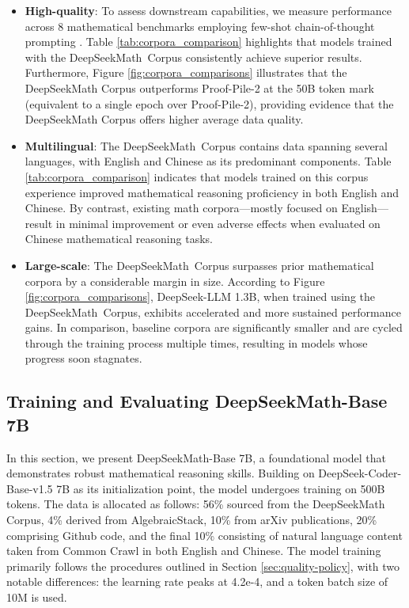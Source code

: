 \begin{itemize}[topsep=0pt]
\begin{itemize}[topsep=0pt]
    \item \textbf{High-quality}:
    To assess downstream capabilities, we measure performance across 8 mathematical benchmarks employing few-shot chain-of-thought prompting \cite{cot}. Table \ref{tab:corpora_comparison} highlights that models trained with the DeepSeekMath~Corpus consistently achieve superior results. Furthermore, Figure \ref{fig:corpora_comparisons} illustrates that the DeepSeekMath Corpus outperforms Proof-Pile-2 at the 50B token mark (equivalent to a single epoch over Proof-Pile-2), providing evidence that the DeepSeekMath Corpus offers higher average data quality.
    \item \textbf{Multilingual}:
    The DeepSeekMath~Corpus contains data spanning several languages, with English and Chinese as its predominant components. Table \ref{tab:corpora_comparison} indicates that models trained on this corpus experience improved mathematical reasoning proficiency in both English and Chinese. By contrast, existing math corpora—mostly focused on English—result in minimal improvement or even adverse effects when evaluated on Chinese mathematical reasoning tasks.
    \item \textbf{Large-scale}:
    The DeepSeekMath~Corpus surpasses prior mathematical corpora by a considerable margin in size. According to Figure \ref{fig:corpora_comparisons}, DeepSeek-LLM 1.3B, when trained using the DeepSeekMath~Corpus, exhibits accelerated and more sustained performance gains. In comparison, baseline corpora are significantly smaller and are cycled through the training process multiple times, resulting in models whose progress soon stagnates.
\end{itemize}

\subsection{Training and Evaluating DeepSeekMath-Base 7B}

In this section, we present DeepSeekMath-Base 7B, a foundational model that demonstrates robust mathematical reasoning skills. Building on DeepSeek-Coder-Base-v1.5 7B \citep{deepseek-coder} as its initialization point, the model undergoes training on 500B tokens. The data is allocated as follows: 56\% sourced from the DeepSeekMath Corpus, 4\% derived from AlgebraicStack, 10\% from arXiv publications, 20\% comprising Github code, and the final 10\% consisting of natural language content taken from Common Crawl in both English and Chinese. The model training primarily follows the procedures outlined in Section \ref{sec:quality-policy}, with two notable differences: the learning rate peaks at 4.2e-4, and a token batch size of 10M is used.


\end{itemize}
